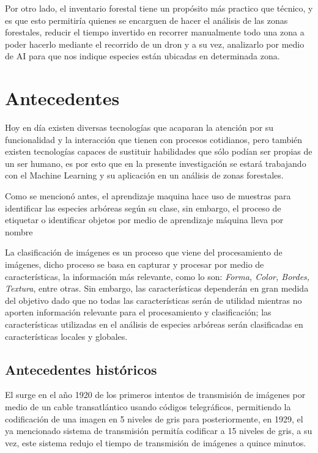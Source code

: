 Por otro lado, el inventario forestal tiene un propósito más practico que técnico, y es que esto permitiría quienes se encarguen de hacer el análisis de las zonas forestales, reducir el tiempo invertido en recorrer manualmente todo una zona a poder hacerlo mediante el recorrido de un dron y a su vez, analizarlo por medio de AI para que nos indique especies están ubicadas en determinada zona.

\chapter{Antecedentes}

Hoy en día existen diversas tecnologías que acaparan la atención por su funcionalidad y la interacción que tienen con procesos cotidianos, pero también existen tecnologías capaces de sustituir habilidades que sólo podían ser propias de un ser humano, es por esto que en la presente investigación se estará trabajando con el Machine Learning y su aplicación en un análisis de zonas forestales.

Como se mencionó antes, el aprendizaje maquina hace uso de muestras para identificar las especies arbóreas según su clase, sin embargo, el proceso de etiquetar o identificar objetos por medio de aprendizaje máquina lleva por nombre  

La clasificación de imágenes es un proceso que viene del procesamiento de imágenes, dicho proceso se basa en capturar y procesar por medio de características, la información más relevante, como lo son: \textit{Forma, Color, Bordes, Textura}, entre otras. Sin embargo, las características dependerán en gran medida del objetivo dado que no todas las características serán de utilidad mientras no aporten información relevante para el procesamiento y clasificación; las características utilizadas en el análisis de especies arbóreas serán clasificadas en características locales y globales. 

\section{Antecedentes históricos}
El  surge  en el año 1920 de los primeros intentos de transmisión de imágenes \cite{rf4} por medio de un cable transatlántico usando códigos telegráficos, permitiendo la codificación de una imagen en 5 niveles de gris para posteriormente, en 1929, el ya mencionado sistema de transmisión permitía codificar a 15 niveles de gris, a su vez, este sistema redujo el tiempo de transmisión de imágenes a quince minutos. 


